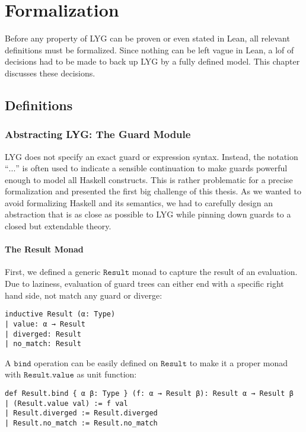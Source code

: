 \chapter{Formalization}\label{sec:formalization}

Before any property of LYG can be proven or even stated in Lean, all relevant definitions must be formalized.
Since nothing can be left vague in Lean, a lof of decisions had to be made to back up LYG by a fully defined model. 
This chapter discusses these decisions.

\section{Definitions}

\subsection{Abstracting LYG: The Guard Module}
LYG does not specify an exact guard or expression syntax.
Instead, the notation ``$...$'' is often used to indicate a sensible continuation to make guards powerful enough to model all Haskell constructs.
This is rather problematic for a precise formalization and presented the first big challenge of this thesis.
As we wanted to avoid formalizing Haskell and its semantics, we had to carefully design an abstraction that is as close as possible to LYG
while pinning down guards to a closed but extendable theory.

\subsubsection{The Result Monad}

First, we defined a generic $\mathtt{Result}$ monad to capture the result of an evaluation.
Due to laziness, evaluation of guard trees can either end with a specific right hand side, not match any guard or diverge:

\begin{verbatim}
inductive Result (α: Type)
| value: α → Result
| diverged: Result
| no_match: Result
\end{verbatim}

A $\mathtt{bind}$ operation can be easily defined on $\mathtt{Result}$ to make it a proper monad with $\mathtt{Result.value}$ as unit function:

\begin{verbatim}
def Result.bind { α β: Type } (f: α → Result β): Result α → Result β
| (Result.value val) := f val
| Result.diverged := Result.diverged
| Result.no_match := Result.no_match
\end{verbatim}

